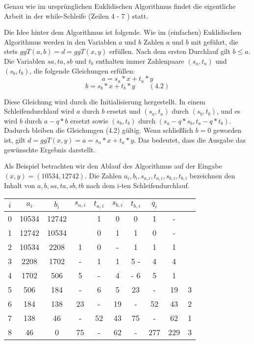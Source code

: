 \documentclass[a4paper]{article}
\begin{document}
\begin{multicols}{3}
    Genau wie im ursprünglichen Euklidischen Algorithmus findet die eigentliche Arbeit in der while-Schleife (Zeilen 4 - 7 ) statt.

    Die Idee hinter dem Algorithmus ist folgende. Wie im (einfachen) Euklidischen Algorithmus werden in den Variablen $a$ und $b$ Zahlen $a$ und $b$ mit geführt, die stets $ggT(a,b) =d= ggT(x,y)$ erfüllen. Nach dem ersten Durchlauf gilt $b\leq a$. Die Variablen $sa,ta,sb$ und $t_b$ enthalten immer Zahlenpaare $(s_a,t_a)$ und $(s_b,t_b)$, die folgende Gleichungen erfüllen:
    $$a=s_a*x+t_a*y$$
    $$b=s_b*x+t_b*y \quad\quad(4.2)$$

    Diese Gleichung wird durch die Initialisierung hergestellt. In einem Schleifendurchlauf wird $a$ durch $b$ ersetzt und $(s_a,t_a)$ durch $(s_b,t_b)$, und es wird $b$ durch $a-q*b$ ersetzt sowie $(s_b,t_b)$ durch $(s_a-q*s_b, t_a-q*t_b)$. Dadurch bleiben die Gleichungen (4.2) gültig. Wenn schließlich $b=0$ geworden ist, gilt $d=ggT(x,y) =a=s_a*x+t_a*y$. Das bedeutet, dass die Ausgabe das gewünschte Ergebnis darstellt.

    Als Beispiel betrachten wir den Ablauf des Algorithmus auf der Eingabe $(x,y) =(10534,12742)$. Die Zahlen $a_i,b_i,s_{a,i},t_{a,i},s_{b,i},t_{b,i}$ bezeichnen den Inhalt von $a,b,sa,ta,sb,tb$ nach dem i-ten Schleifendurchlauf.
    \begin{tabular}{c|c|c|c|c|c|c|c|c|c}
        $i$ & $a_i$ & $b_i$ & $s_{a,i}$ & $t_{a,i}$ & $s_{b,i}$ & $t_{b,i}$ & $q_i$ &     &   \\\hline
        0   & 10534 & 12742 &           & 1         & 0         & 0         & 1     & -       \\
        1   & 12742 & 10534 &           & 0         & 1         & 1         & 0     & -       \\
        2   & 10534 & 2208  & 1         & 0         & -         & 1         & 1     & 1       \\
        3   & 2208  & 1702  & -         & 1         & 1         & 5 -       & 4     & 4       \\
        4   & 1702  & 506   & 5         & -         & 4         & - 6       & 5     & 1       \\
        5   & 506   & 184   & -         & 6         & 5         & 23        & -     & 19  & 3 \\
        6   & 184   & 138   & 23        & -         & 19        & -         & 52    & 43  & 2 \\
        7   & 138   & 46    & -         & 52        & 43        & 75        & -     & 62  & 1 \\
        8   & 46    & 0     & 75        & -         & 62        & -         & 277   & 229 & 3
    \end{tabular}


\end{multicols}
\end{document}
